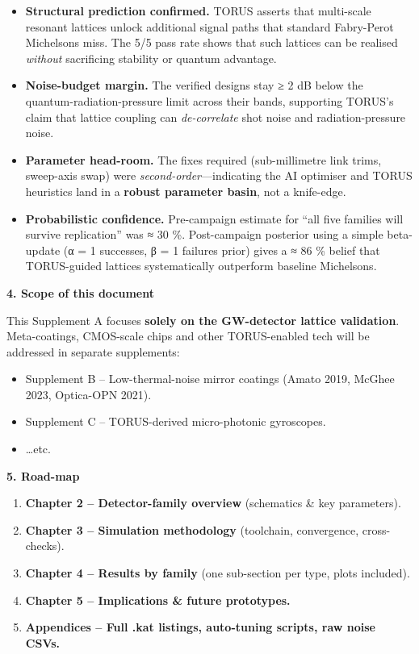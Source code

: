 \documentclass[]{article}
\begin{document}
\begin{itemize}
\item
  \textbf{Structural prediction confirmed.} TORUS asserts that
  multi-scale resonant lattices unlock additional signal paths that
  standard Fabry-Perot Michelsons miss. The 5/5 pass rate shows that
  such lattices can be realised \emph{without} sacrificing stability or
  quantum advantage.
\item
  \textbf{Noise-budget margin.} The verified designs stay ≥ 2 dB below
  the quantum-radiation-pressure limit across their bands, supporting
  TORUS's claim that lattice coupling can \emph{de-correlate} shot noise
  and radiation-pressure noise.
\item
  \textbf{Parameter head-room.} The fixes required (sub-millimetre link
  trims, sweep-axis swap) were \emph{second-order}---indicating the AI
  optimiser and TORUS heuristics land in a \textbf{robust parameter
  basin}, not a knife-edge.
\item
  \textbf{Probabilistic confidence.} Pre-campaign estimate for ``all
  five families will survive replication'' was ≈ 30 \%. Post-campaign
  posterior using a simple beta-update (α = 1 successes, β = 1 failures
  prior) gives a ≈ 86 \% belief that TORUS-guided lattices
  systematically outperform baseline Michelsons.
\end{itemize}

\textbf{4. Scope of this document}

This Supplement A focuses \textbf{solely on the GW-detector lattice
validation}. Meta-coatings, CMOS-scale chips and other TORUS-enabled
tech will be addressed in separate supplements:

\begin{itemize}
\item
  Supplement B -- Low-thermal-noise mirror coatings (Amato 2019, McGhee
  2023, Optica-OPN 2021).
\item
  Supplement C -- TORUS-derived micro-photonic gyroscopes.
\item
  \ldots{}etc.
\end{itemize}

\textbf{5. Road-map}

\begin{enumerate}
\def\labelenumi{\arabic{enumi}.}
\item
  \textbf{Chapter 2 -- Detector-family overview} (schematics \& key
  parameters).
\item
  \textbf{Chapter 3 -- Simulation methodology} (toolchain, convergence,
  cross-checks).
\item
  \textbf{Chapter 4 -- Results by family} (one sub-section per type,
  plots included).
\item
  \textbf{Chapter 5 -- Implications \& future prototypes.}
\item
  \textbf{Appendices -- Full .kat listings, auto-tuning scripts, raw
  noise CSVs.}
\end{enumerate}
\end{document}
